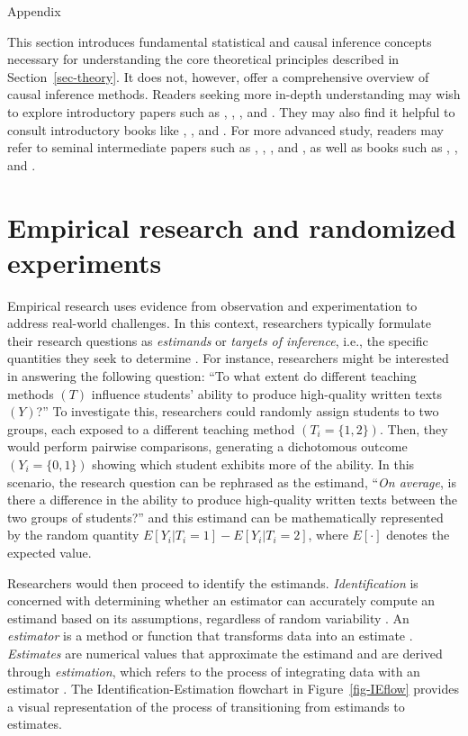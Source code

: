 \documentclass[
  authoryear,
  review,
  1p]{elsarticle}
\begin{document}
\newpage{}

Appendix

This section introduces fundamental statistical and causal inference
concepts necessary for understanding the core theoretical principles
described in Section~\ref{sec-theory}. It does not, however, offer a
comprehensive overview of causal inference methods. Readers seeking more
in-depth understanding may wish to explore introductory papers such as
\citet{Pearl_2010}, \citet{Rohrer_2018}, \citet{Pearl_2019}, and
\citet{Cinelli_et_al_2020}. They may also find it helpful to consult
introductory books like \citet{Pearl_et_al_2018}, \citet{Neal_2020}, and
\citet{McElreath_2020}. For more advanced study, readers may refer to
seminal intermediate papers such as \citet{Neyman_et_al_1923},
\citet{Rubin_1974}, \citet{Spirtes_et_al_1991}, and \citet{Sekhon_2009},
as well as books such as \citet{Pearl_2009}, \citet{Morgan_et_al_2014},
and \citet{Hernan_et_al_2020}.

\section{Empirical research and randomized
experiments}\label{sec-appendix-A}

Empirical research uses evidence from observation and experimentation to
address real-world challenges. In this context, researchers typically
formulate their research questions as \emph{estimands} or \emph{targets
of inference}, i.e., the specific quantities they seek to determine
\citep{Everitt_et_al_2010}. For instance, researchers might be
interested in answering the following question: ``To what extent do
different teaching methods \((T)\) influence students' ability to
produce high-quality written texts \((Y)\)?'' To investigate this,
researchers could randomly assign students to two groups, each exposed
to a different teaching method \((T_{i} = \{1,2\})\). Then, they would
perform pairwise comparisons, generating a dichotomous outcome
\((Y_{i} = \{0,1\})\) showing which student exhibits more of the
ability. In this scenario, the research question can be rephrased as the
estimand, ``\emph{On average}, is there a difference in the ability to
produce high-quality written texts between the two groups of students?''
and this estimand can be mathematically represented by the random
quantity \(E[Y_{i}| T_{i}=1] - E[Y_{i}| T_{i}=2]\), where \(E[\cdot]\)
denotes the expected value.

Researchers would then proceed to identify the estimands.
\emph{Identification} is concerned with determining whether an estimator
can accurately compute an estimand based on its assumptions, regardless
of random variability \citep[pp.~4]{Schuessler_et_al_2023}. An
\emph{estimator} is a method or function that transforms data into an
estimate \citep{Neal_2020}. \emph{Estimates} are numerical values that
approximate the estimand and are derived through \emph{estimation},
which refers to the process of integrating data with an estimator
\citep{Everitt_et_al_2010}. The Identification-Estimation flowchart
\citep{McElreath_2020, Neal_2020} in Figure~\ref{fig-IEflow} provides a
visual representation of the process of transitioning from estimands to
estimates.
\end{document}
